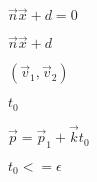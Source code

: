 \documentclass{article}
\begin{document}
$\vec{n}\vec{x}+d=0$
\pagebreak

$\vec{n}\vec{x}+d$
\pagebreak

$(\vec{v}_1,\vec{v}_2)$
\pagebreak

$t_0$
\pagebreak

$\vec{p}=\vec{p}_1+\vec{k}t_0$
\pagebreak

$t_0<=\epsilon$
\pagebreak
\end{document}
